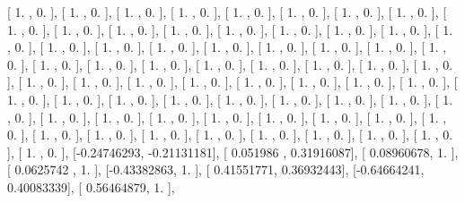 \documentclass{article}
\begin{document}
       [ 1.        ,  0.        ],
       [ 1.        ,  0.        ],
       [ 1.        ,  0.        ],
       [ 1.        ,  0.        ],
       [ 1.        ,  0.        ],
       [ 1.        ,  0.        ],
       [ 1.        ,  0.        ],
       [ 1.        ,  0.        ],
       [ 1.        ,  0.        ],
       [ 1.        ,  0.        ],
       [ 1.        ,  0.        ],
       [ 1.        ,  0.        ],
       [ 1.        ,  0.        ],
       [ 1.        ,  0.        ],
       [ 1.        ,  0.        ],
       [ 1.        ,  0.        ],
       [ 1.        ,  0.        ],
       [ 1.        ,  0.        ],
       [ 1.        ,  0.        ],
       [ 1.        ,  0.        ],
       [ 1.        ,  0.        ],
       [ 1.        ,  0.        ],
       [ 1.        ,  0.        ],
       [ 1.        ,  0.        ],
       [ 1.        ,  0.        ],
       [ 1.        ,  0.        ],
       [ 1.        ,  0.        ],
       [ 1.        ,  0.        ],
       [ 1.        ,  0.        ],
       [ 1.        ,  0.        ],
       [ 1.        ,  0.        ],
       [ 1.        ,  0.        ],
       [ 1.        ,  0.        ],
       [ 1.        ,  0.        ],
       [ 1.        ,  0.        ],
       [ 1.        ,  0.        ],
       [ 1.        ,  0.        ],
       [ 1.        ,  0.        ],
       [ 1.        ,  0.        ],
       [ 1.        ,  0.        ],
       [ 1.        ,  0.        ],
       [ 1.        ,  0.        ],
       [ 1.        ,  0.        ],
       [ 1.        ,  0.        ],
       [ 1.        ,  0.        ],
       [ 1.        ,  0.        ],
       [ 1.        ,  0.        ],
       [ 1.        ,  0.        ],
       [ 1.        ,  0.        ],
       [ 1.        ,  0.        ],
       [ 1.        ,  0.        ],
       [ 1.        ,  0.        ],
       [ 1.        ,  0.        ],
       [ 1.        ,  0.        ],
       [ 1.        ,  0.        ],
       [ 1.        ,  0.        ],
       [ 1.        ,  0.        ],
       [ 1.        ,  0.        ],
       [ 1.        ,  0.        ],
       [ 1.        ,  0.        ],
       [ 1.        ,  0.        ],
       [ 1.        ,  0.        ],
       [ 1.        ,  0.        ],
       [ 1.        ,  0.        ],
       [ 1.        ,  0.        ],
       [ 1.        ,  0.        ],
       [ 1.        ,  0.        ],
       [-0.24746293, -0.21131181],
       [ 0.051986  ,  0.31916087],
       [ 0.08960678,  1.        ],
       [ 0.0625742 ,  1.        ],
       [-0.43382863,  1.        ],
       [ 0.41551771,  0.36932443],
       [-0.64664241,  0.40083339],
       [ 0.56464879,  1.        ],
\end{document}
